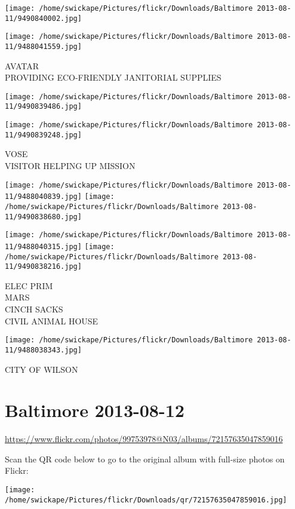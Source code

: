 \documentclass[10pt,letterpaper]{article}
\begin{document}
\texttt{[image: /home/swickape/Pictures/flickr/Downloads/Baltimore 2013-08-11/9490840002.jpg]}

\vspace{0.25in}
\texttt{[image: /home/swickape/Pictures/flickr/Downloads/Baltimore 2013-08-11/9488041559.jpg]}

AVATAR\\
PROVIDING ECO{-}FRIENDLY JANITORIAL SUPPLIES
\pagebreak

\texttt{[image: /home/swickape/Pictures/flickr/Downloads/Baltimore 2013-08-11/9490839486.jpg]}

\vspace{0.25in}
\texttt{[image: /home/swickape/Pictures/flickr/Downloads/Baltimore 2013-08-11/9490839248.jpg]}

VOSE\\
VISITOR HELPING UP MISSION
\pagebreak

\texttt{[image: /home/swickape/Pictures/flickr/Downloads/Baltimore 2013-08-11/9488040839.jpg]}
\texttt{[image: /home/swickape/Pictures/flickr/Downloads/Baltimore 2013-08-11/9490838680.jpg]}

\texttt{[image: /home/swickape/Pictures/flickr/Downloads/Baltimore 2013-08-11/9488040315.jpg]}
\texttt{[image: /home/swickape/Pictures/flickr/Downloads/Baltimore 2013-08-11/9490838216.jpg]}

ELEC PRIM\\
MARS\\
CINCH SACKS\\
CIVIL ANIMAL HOUSE
\pagebreak

\texttt{[image: /home/swickape/Pictures/flickr/Downloads/Baltimore 2013-08-11/9488038343.jpg]}

CITY OF WILSON
\pagebreak

\section*{Baltimore 2013-08-12}

\url{https://www.flickr.com/photos/99753978@N03/albums/72157635047859016}

Scan the QR code below to go to the original album with full-size photos on Flickr:

\texttt{[image: /home/swickape/Pictures/flickr/Downloads/qr/72157635047859016.jpg]}
\pagebreak
\end{document}
